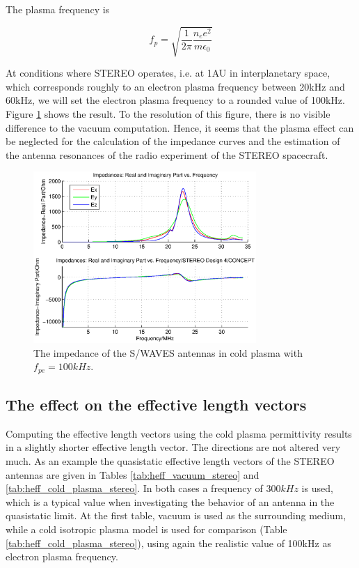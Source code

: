 \documentclass[two-coloumn,ras]{agutex}
\begin{document}
\begin{article}
The plasma frequency is

\begin{equation}\label{Plasma frequency}
    f_p=\sqrt{\frac{1}{2\pi}{\frac{n_e e^2}{ m \epsilon_0}}}
\end{equation}

At conditions where STEREO operates, i.e. at 1AU in interplanetary space, which corresponds roughly to an electron plasma frequency between 20kHz and 60kHz, we will set the electron plasma frequency to a rounded value of 100kHz. Figure \ref{fig:imp_stereo_fix_100kHz} shows the result. To the resolution of this figure, there is no visible difference to the vacuum computation. Hence, it seems that the plasma effect can be neglected for the calculation of the impedance curves and the estimation of the antenna resonances of the radio experiment of the STEREO spacecraft.


\begin{figure}
\noindent\includegraphics[width=20pc]{impedance_stereo_pl_100khz.eps}
  \caption{The impedance of the S/WAVES antennas in cold plasma with $f_{pe}=100kHz$.}\label{fig:imp_stereo_fix_100kHz}
\end{figure}

\subsection{The effect on the effective length vectors}
Computing the effective length vectors using the cold plasma permittivity results in a slightly shorter effective length vector. The directions are not altered very much. As an example the quasistatic effective length vectors of the STEREO antennas are given in Tables \ref{tab:heff_vacuum_stereo} and \ref{tab:heff_cold_plasma_stereo}. In both cases a frequency of $300kHz$ is used, which is a typical value when investigating the behavior of an antenna in the quasistatic limit. At the first table, vacuum is used as the surrounding medium, while a cold isotropic plasma model is used for comparison (Table \ref{tab:heff_cold_plasma_stereo}), using again the realistic value of 100kHz as electron plasma frequency.\\


\end{article}
\end{document}
